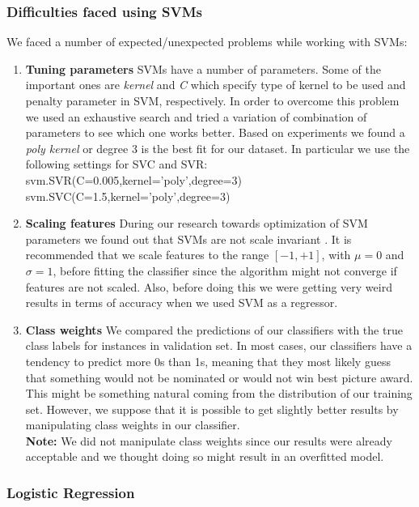 \documentclass[journal,transmag]{IEEEtran}
\begin{document}
\subsubsection{Difficulties faced using SVMs}
\label{svm}
We faced a number of expected/unexpected problems while working with SVMs:
\begin{enumerate}
\item{\textbf{Tuning parameters}} SVMs have a number of parameters. Some of the important ones are \emph{kernel} and \emph{C} which specify type of kernel to be used and penalty parameter in SVM, respectively. In order to overcome this problem we used an exhaustive search and tried a variation of combination of parameters to see which one works better. Based on experiments we found a \textit{poly kernel} or degree 3 is the best fit for our dataset. In particular we use the following settings for SVC and SVR:\\
svm.SVR(C=0.005,kernel='poly',degree=3)\\
svm.SVC(C=1.5,kernel='poly',degree=3)

\item{\textbf{Scaling features}} During our research towards optimization of SVM parameters we found out that SVMs are not scale invariant \cite{ref6}. It is recommended that we scale features to the range $[-1, +1]$, with $\mu = 0$ and $\sigma = 1$, before fitting the classifier since the algorithm might not converge if features are not scaled. Also, before doing this we were getting very weird results in terms of accuracy when we used SVM as a regressor.

\item{\textbf{Class weights} We compared the predictions of our classifiers with the true class labels for instances in validation set. In most cases, our classifiers have a tendency to predict more 0s than 1s, m}eaning that they most likely guess that something would not be nominated or would not win best picture award. This might be something natural coming from the distribution of our training set. However, we suppose that it is possible to get slightly better results by manipulating class weights in our classifier.\\
\textbf{Note:} We did not manipulate class weights since our results were already acceptable and we thought doing so might result in an overfitted model.
\end{enumerate}

			
			\subsubsection{Logistic Regression}
			
\end{document}
